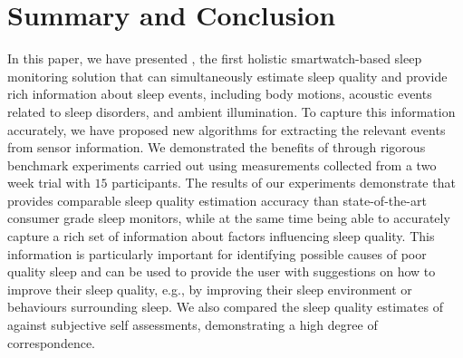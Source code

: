 
\section{Summary and Conclusion}

In this paper, we have presented \systemname, the first holistic smartwatch-based sleep monitoring solution that can simultaneously estimate sleep quality and provide rich information about sleep events, including body motions, acoustic events related to sleep disorders, and ambient illumination. To capture this information accurately, we have proposed new algorithms for extracting the relevant events from sensor information. We demonstrated the benefits of \systemname through rigorous benchmark experiments carried out using measurements collected from a two week trial with $15$ participants. The results of our experiments demonstrate that \systemname provides comparable sleep quality estimation accuracy than state-of-the-art consumer grade sleep monitors, while at the same time being able to accurately capture a rich set of information about factors influencing sleep quality. This information is particularly important for identifying possible causes of poor quality sleep and can be used to provide the user with suggestions on how to improve their sleep quality, e.g., by improving their sleep environment or behaviours surrounding sleep. We also compared the sleep quality estimates of \systemname against subjective self assessments, demonstrating a high degree of correspondence. 

